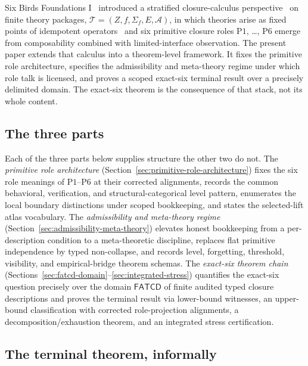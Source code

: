 \documentclass[11pt]{article}
\theoremstyle{definition}
\newcommand{\FATCD}{\ensuremath{\mathsf{FATCD}}}
\newcommand{\Pone}{\ensuremath{\mathrm{P1}}}
\newcommand{\Psix}{\ensuremath{\mathrm{P6}}}
\begin{document}
Six Birds Foundations I~\citep{Tsiokos2026SixBirdsFoundations}
introduced a stratified closure-calculus
perspective~\citep{Anderson1972} on finite theory packages,
\(\mathcal{T} = (Z, f, \Sigma_f, E, \mathcal{A})\), in which theories
arise as fixed points of idempotent
operators~\citep{DaveyPriestley2002} and six primitive closure roles
\Pone{}, \ldots, \Psix{} emerge from composability combined with
limited-interface observation. The present paper extends
that calculus into a theorem-level framework. It fixes the primitive
role architecture, specifies the admissibility and meta-theory regime
under which role talk is licensed, and proves a scoped exact-six
terminal result over a precisely delimited domain. The exact-six
theorem is the consequence of that stack, not its whole content.

\subsection{The three parts}\label{subsec:three-pillars}

Each of the three parts below supplies structure the other two do not.
The \emph{primitive role architecture}
(Section~\ref{sec:primitive-role-architecture}) fixes the six role
meanings of \Pone{}--\Psix{} at their corrected alignments, records
the common behavioral, verification, and structural-categorical level
pattern, enumerates the local boundary distinctions under scoped
bookkeeping, and states the selected-lift atlas vocabulary. The
\emph{admissibility and meta-theory regime}
(Section~\ref{sec:admissibility-meta-theory}) elevates honest
bookkeeping from a per-description condition to a meta-theoretic
discipline, replaces flat primitive independence by typed
non-collapse, and records level, forgetting, threshold, visibility,
and empirical-bridge theorem schemas. The \emph{exact-six theorem
chain}
(Sections~\ref{sec:fatcd-domain}--\ref{sec:integrated-stress})
quantifies the exact-six question precisely over the domain \FATCD{}
of finite audited typed closure descriptions and proves the terminal
result via lower-bound witnesses, an upper-bound classification with
corrected role-projection alignments, a decomposition/exhaustion
theorem, and an integrated stress certification.

\subsection{The terminal theorem, informally}\label{subsec:terminal-informal}
\end{document}
